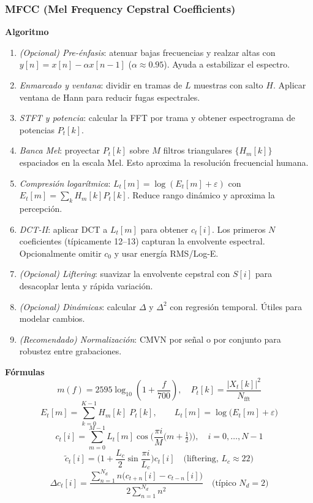 \subsubsection{MFCC (Mel Frequency Cepstral Coefficients)}
\textbf{Algoritmo} \parencite{davis1980comparison, muller2015fmp, slaney1998auditory, logan2000mfcc}
\begin{enumerate}
    \item \emph{(Opcional) Pre-énfasis}: atenuar bajas frecuencias y realzar altas con \(y[n]=x[n]-\alpha x[n-1]\) (\(\alpha\approx0.95\)). Ayuda a estabilizar el espectro.
    \item \emph{Enmarcado y ventana}: dividir en tramas de \(L\) muestras con salto \(H\). Aplicar ventana de Hann para reducir fugas espectrales.
    \item \emph{STFT y potencia}: calcular la FFT por trama y obtener espectrograma de potencias \(P_t[k]\).
    \item \emph{Banca Mel}: proyectar \(P_t[k]\) sobre \(M\) filtros triangulares \(\{H_m[k]\}\) espaciados en la escala Mel. Esto aproxima la resolución frecuencial humana.
    \item \emph{Compresión logarítmica}: \(L_t[m]=\log(E_t[m]+\varepsilon)\) con \(E_t[m]=\sum_k H_m[k]P_t[k]\). Reduce rango dinámico y aproxima la percepción.
    \item \emph{DCT-II}: aplicar DCT a \(L_t[m]\) para obtener \(c_t[i]\). Los primeros \(N\) coeficientes (típicamente 12–13) capturan la envolvente espectral. Opcionalmente omitir \(c_0\) y usar energía RMS/Log-E.
    \item \emph{(Opcional) Liftering}: suavizar la envolvente cepstral con \(S[i]\) para desacoplar lenta y rápida variación.
    \item \emph{(Opcional) Dinámicas}: calcular \(\Delta\) y \(\Delta^2\) con regresión temporal. Útiles para modelar cambios.
    \item \emph{(Recomendado) Normalización}: CMVN por señal o por conjunto para robustez entre grabaciones.
\end{enumerate}

\textbf{Fórmulas} \parencite{davis1980comparison, muller2015fmp}
\[
m(f)=2595\log_{10}\!\left(1+\frac{f}{700}\right),\quad
P_t[k]=\frac{|X_t[k]|^2}{N_{\mathrm{fft}}}
\]
\[
E_t[m]=\sum_{k=0}^{K-1} H_m[k]\;P_t[k],\qquad
L_t[m]=\log\!\big(E_t[m]+\varepsilon\big)
\]
\[
c_t[i]=\sum_{m=0}^{M-1} L_t[m]\cos\!\Big(\frac{\pi i}{M}\big(m+\tfrac12\big)\Big),\quad i=0,\dots,N-1
\]
\[
\tilde c_t[i]=\Big(1+\frac{L_c}{2}\sin\frac{\pi i}{L_c}\Big)c_t[i]\quad\text{(liftering, \(L_c\approx22\))}
\]
\[
\Delta c_t[i]=\frac{\sum_{n=1}^{N_d}n\big(c_{t+n}[i]-c_{t-n}[i]\big)}{2\sum_{n=1}^{N_d}n^2}\quad\text{(típico \(N_d=2\))}
\]

